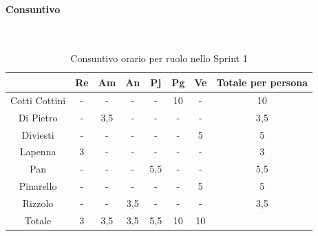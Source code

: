 \documentclass{article}
\begin{document}
                \paragraph{Consuntivo}\mbox{}\\
                \begin{table}[H]
                    \centering
                    \begin{tabular}{|c|c|c|c|c|c|c|c|}
                    \hline
                                    & Re  & Am  & An  & Pj  & Pg  & Ve  & Totale per persona \\ \hline
                    Cotti Cottini & -   & -   & -   & -   & 10  & -   & 10                 \\ \hline
                    Di Pietro     & -   & 3,5 & -   & -   & -   & -   & 3,5                \\ \hline
                    Diviesti      & -   & -   & -   & -   & -   & 5   & 5                  \\ \hline
                    Lapenna       & 3   & -   & -   & -   & -   & -   & 3                  \\ \hline
                    Pan           & -   & -   & -   & 5,5 & -   & -   & 5,5                \\ \hline
                    Pinarello     & -   & -   & -   & -   & -   & 5   & 5                  \\ \hline
                    Rizzolo       & -   & -   & 3,5 & -   & -   & -   & 3,5                \\ \hline
                    Totale        & 3   & 3,5 & 3,5 & 5,5 & 10  & 10  &                    \\ \hline
                    \end{tabular}
                    \caption{Consuntivo orario per ruolo nello Sprint 1}
                \end{table}

\end{document}
